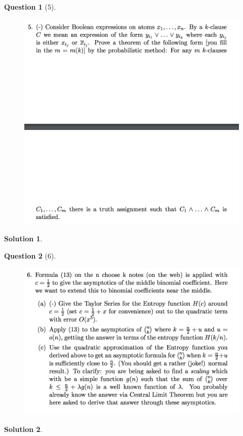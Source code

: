 \documentclass{article} %
\theoremstyle{quest}
\newtheorem*{question}{Question}
\newtheorem*{solution}{Solution}
\begin{document}
\begin{question}[5]
\hfill
\begin{figure}[h!]
  \centering
    \includegraphics[width=1\textwidth]{pm-1-5.png}
\end{figure}
\end{question}
\begin{solution} 

 
\end{solution}

\pagebreak

\begin{question}[6]
\hfill
\begin{figure}[h!]
  \centering
    \includegraphics[width=1\textwidth]{pm-1-6.png}
\end{figure}
\end{question}
\begin{solution} 

 
\end{solution}
\end{document}
